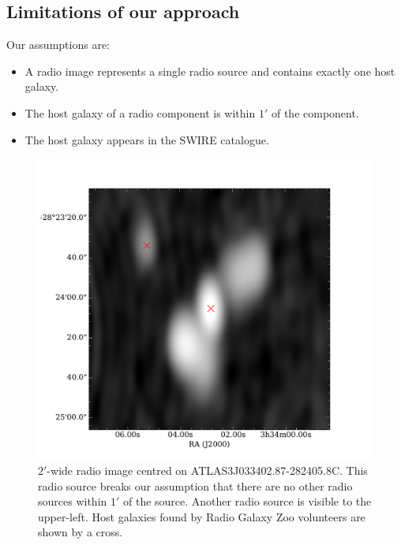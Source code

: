 \documentclass[fleqn,usenatbib,usedcolumn]{mnras}
\begin{document}
  \subsection{Limitations of our approach}
  \label{sec:limitations}

    Our assumptions are:
    \begin{itemize}
      \item A radio image represents a single radio source and contains exactly
        one host galaxy.
      \item The host galaxy of a radio component is within $1'$ of the component.
      \item The host galaxy appears in the SWIRE catalogue.
    \end{itemize}

    \begin{figure}
      \centering
      \includegraphics[width=\linewidth]{images/ARG0003r2v_radio.pdf}
      \caption{$2'$-wide radio image centred on ATLAS3\textunderscore{}J033402.87-282405.8C.
        This radio source breaks our assumption that there are no other radio
        sources within $1'$ of the source. Another radio source is visible to
        the upper-left. Host galaxies found by Radio Galaxy Zoo volunteers are
        shown by a cross.}
      \label{fig:broken-isolation}
    \end{figure}
\end{document}
